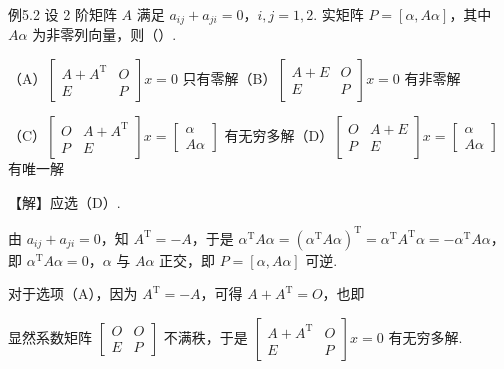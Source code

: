 \begin{fcard}{例5.2}
设 2 阶矩阵 $A$ 满足 $a_{ij}+a_{ji}=0$，$i,j=1,2$. 实矩阵 $P=[\alpha,A\alpha]$，其中 $A\alpha$ 为非零列向量，则（\quad）.

（A）$\begin{bmatrix}A+A^{\mathrm T}&O\\E&P\end{bmatrix}x=0$ 只有零解\qquad（B）$\begin{bmatrix}A+E&O\\E&P\end{bmatrix}x=0$ 有非零解

（C）$\begin{bmatrix}O&A+A^{\mathrm T}\\P&E\end{bmatrix}x=\begin{bmatrix}\alpha\\A\alpha\end{bmatrix}$ 有无穷多解\qquad（D）$\begin{bmatrix}O&A+E\\P&E\end{bmatrix}x=\begin{bmatrix}\alpha\\A\alpha\end{bmatrix}$ 有唯一解

【解】应选（D）.


由 $a_{ij}+a_{ji}=0$，知 $A^{\mathrm T}=-A$，于是 $\alpha^{\mathrm T}A\alpha=(\alpha^{\mathrm T}A\alpha)^{\mathrm T}=\alpha^{\mathrm T}A^{\mathrm T}\alpha=-\alpha^{\mathrm T}A\alpha$，即 $\alpha^{\mathrm T}A\alpha=0$，$\alpha$ 与 $A\alpha$ 正交，即 $P=[\alpha,A\alpha]$ 可逆.

对于选项（A），因为 $A^{\mathrm T}=-A$，可得 $A+A^{\mathrm T}=O$，也即

显然系数矩阵 $\begin{bmatrix}O&O\\E&P\end{bmatrix}$ 不满秩，于是 $\begin{bmatrix}A+A^{\mathrm T}&O\\E&P\end{bmatrix}x=0$ 有无穷多解.


\end{fcard}
